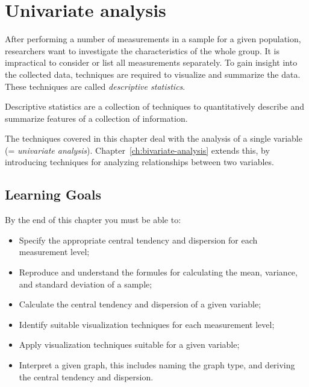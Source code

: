 \chapter{Univariate analysis}
\label{ch:univariate-analysis}

After performing a number of measurements in a sample for a given population, researchers want to investigate the characteristics of the whole group. It is impractical to consider or list all measurements separately. To gain insight into the collected data, techniques are required to visualize and summarize the data. These techniques are called \emph{descriptive statistics}.


\begin{definition}
  Descriptive statistics are a collection of techniques to quantitatively describe and summarize features of a collection of information.
\end{definition}

The techniques covered in this chapter deal with the analysis of a single variable (= \emph{univariate analysis}). Chapter~\ref{ch:bivariate-analysis} extends this, by introducing techniques for analyzing relationships between two variables.

\section{Learning Goals}
\label{sec:analyse1var-leerdoelen}

By the end of this chapter you must be able to:

\begin{itemize}
    \item Specify the appropriate central tendency and dispersion for each measurement level;
    \item Reproduce and understand the formules for calculating the mean, variance, and standard deviation of a sample;
    \item Calculate the central tendency and dispersion of a given variable;
    \item Identify suitable visualization techniques for each measurement level;
    \item Apply visualization techniques suitable for a given variable;
    \item Interpret a given graph, this includes naming the graph type, and deriving the central tendency and dispersion.
\end{itemize}

